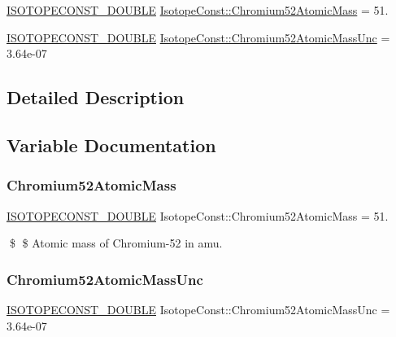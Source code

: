 \begin{DoxyCompactItemize}
\item 
\mbox{\hyperlink{group___isotope_const-_macros_ga8f45a7272ce02c0b4c65c44636ed719a}{I\+S\+O\+T\+O\+P\+E\+C\+O\+N\+S\+T\+\_\+\+D\+O\+U\+B\+LE}} \mbox{\hyperlink{group___isotope_const-_chromium-_cr52_ga5249e6dbf1544bada59fe695dc6ae350}{Isotope\+Const\+::\+Chromium52\+Atomic\+Mass}} = 51.
\item 
\mbox{\hyperlink{group___isotope_const-_macros_ga8f45a7272ce02c0b4c65c44636ed719a}{I\+S\+O\+T\+O\+P\+E\+C\+O\+N\+S\+T\+\_\+\+D\+O\+U\+B\+LE}} \mbox{\hyperlink{group___isotope_const-_chromium-_cr52_ga0451abf8e91e8651f182e2a380728796}{Isotope\+Const\+::\+Chromium52\+Atomic\+Mass\+Unc}} = 3.\+64e-\/07
\end{DoxyCompactItemize}


\subsection{Detailed Description}


\subsection{Variable Documentation}
\mbox{\label{group___isotope_const-_chromium-_cr52_ga5249e6dbf1544bada59fe695dc6ae350}} 
\subsubsection{\texorpdfstring{Chromium52\+Atomic\+Mass}{Chromium52AtomicMass}}
{\footnotesize\ttfamily \mbox{\hyperlink{group___isotope_const-_macros_ga8f45a7272ce02c0b4c65c44636ed719a}{I\+S\+O\+T\+O\+P\+E\+C\+O\+N\+S\+T\+\_\+\+D\+O\+U\+B\+LE}} Isotope\+Const\+::\+Chromium52\+Atomic\+Mass = 51.}

\$ \$ Atomic mass of Chromium-\/52 in amu. \mbox{\label{group___isotope_const-_chromium-_cr52_ga0451abf8e91e8651f182e2a380728796}} 
\subsubsection{\texorpdfstring{Chromium52\+Atomic\+Mass\+Unc}{Chromium52AtomicMassUnc}}
{\footnotesize\ttfamily \mbox{\hyperlink{group___isotope_const-_macros_ga8f45a7272ce02c0b4c65c44636ed719a}{I\+S\+O\+T\+O\+P\+E\+C\+O\+N\+S\+T\+\_\+\+D\+O\+U\+B\+LE}} Isotope\+Const\+::\+Chromium52\+Atomic\+Mass\+Unc = 3.\+64e-\/07}

